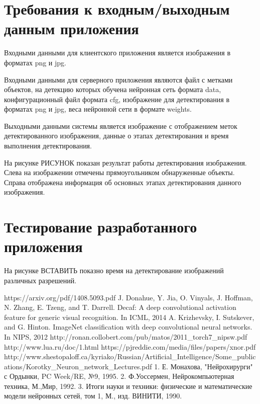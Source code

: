 \documentclass[a4paper,english,russian]{G2-105}
\begin{document}
\section{Требования к входным/выходным данным приложения}
\par Входными данными для клиентского приложения является изображения в форматах png и jpg.
\par Входными данными для серверного приложения являются файл с метками объектов, на детекцию которых обучена нейронная сеть формата data, конфигурационный файл формата cfg, изображение для детектирования в форматах png и jpg, веса нейронной сети в формате weights.
\par Выходными данными системы является изображение с отображением меток детектированного изображения, данные о этапах детектирования и время выполнения детектирования.
\par На рисунке РИСУНОК показан результат работы детектирования изображения. Слева на изображении отмечены прямоугольником обнаруженные объекты. Справа отображена информация об основных этапах детектирования данного изображения.
\section{Тестирование разработанного приложения}
\par На рисунке ВСТАВИТЬ показно время на детектирование изображений различных разрешений.
\newpage
{}
\newpage
\begin{thebibliography}{1}
     https://arxiv.org/pdf/1408.5093.pdf
     J. Donahue, Y. Jia, O. Vinyals, J. Hoffman, N. Zhang, E. Tzeng, and T. Darrell. Decaf: A deep convolutional activation feature for generic visual recognition. In ICML, 2014
  	  A. Krizhevsky, I. Sutskever, and G. Hinton. ImageNet
classification with deep convolutional neural networks. In
NIPS, 2012
	 http://ronan.collobert.com/pub/matos/2011\_torch7\_nipsw.pdf
	 http://www.lua.ru/doc/1.html
	 https://pjreddie.com/media/files/papers/xnor.pdf
	 http://www.shestopaloff.ca/kyriako/Russian/Artificial\_Intelligence/Some\_publications/Korotky\_Neuron\_network\_Lectures.pdf
	 1. Е. Монахова, "Нейрохирурги" с Ордынки, PC Week/RE, №9, 1995.
	2. Ф.Уоссермен, Нейрокомпьютерная техника, М.,Мир, 1992.
	3. Итоги науки и техники: физические и математические модели нейронных сетей, том
1, М., изд. ВИНИТИ, 1990.
\end{thebibliography}


\end{document}
